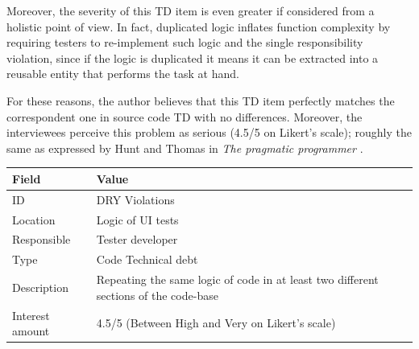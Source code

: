         \label{sec:disc-rq3-dry}
        Moreover, the severity of this TD item is even greater if considered from a holistic point of view. In fact, duplicated logic inflates function complexity by requiring testers to re-implement such logic and the single responsibility violation, since if the logic is duplicated it means it can be extracted into a reusable entity that performs the task at hand.

        For these reasons, the author believes that this TD item perfectly matches the correspondent one in source code TD with no differences. Moreover, the interviewees perceive this problem as serious (4.5/5 on Likert's scale); roughly the same as expressed by Hunt and Thomas in \textit{The pragmatic programmer} \cite{thomas1999pragmatic}.


  \begin{table}[!htbp]
		\centering
		\tabulinesep=1.2mm
		\begin{tabu} to \textwidth {|X|X[3]|}

			\hline
			\textbf{Field} & \textbf{Value} \\
			\hline

			ID & DRY Violations \\
			\hline

			Location & Logic of UI tests \\
			\hline

			Responsible & Tester developer \\
			\hline

			Type & Code Technical debt \\
			\hline

			Description & Repeating the same logic of code in at least two different sections of the code-base\\
			\hline



			Interest amount &  4.5/5 (Between High and Very on Likert's scale) \\
			\hline




\end{tabu}
\end{table}
